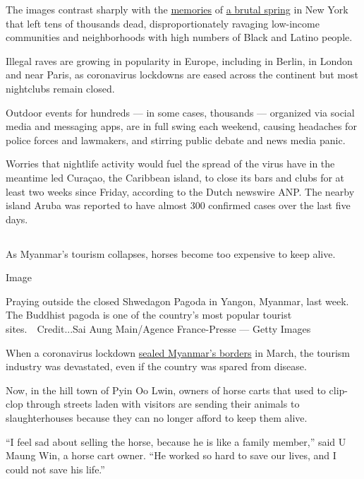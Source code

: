 The images contrast sharply with the
\href{https://www.nytimes.com/2020/08/07/style/coronavirus-nyc-historic-season.html}{memories}
of
\href{https://www.nytimes.com/2020/04/04/nyregion/coronavirus-hospital-brooklyn.html}{a
brutal spring} in New York that left tens of thousands dead,
disproportionately ravaging low-income communities and neighborhoods
with high numbers of Black and Latino people.

Illegal raves are growing in popularity in Europe, including in Berlin,
in London and near Paris, as coronavirus lockdowns are eased across the
continent but most nightclubs remain closed.

Outdoor events for hundreds --- in some cases, thousands --- organized
via social media and messaging apps, are in full swing each weekend,
causing headaches for police forces and lawmakers, and stirring public
debate and news media panic.

Worries that nightlife activity would fuel the spread of the virus have
in the meantime led Curaçao, the Caribbean island, to close its bars and
clubs for at least two weeks since Friday, according to the Dutch
newswire ANP. The nearby island Aruba was reported to have almost 300
confirmed cases over the last five days.

\hypertarget{section-5}{%
\subsection{}\label{section-5}}

As Myanmar's tourism collapses, horses become too expensive to keep
alive.

Image

Praying outside the closed Shwedagon Pagoda in Yangon, Myanmar, last
week. The Buddhist pagoda is one of the country's most popular tourist
sites.~~Credit...Sai Aung Main/Agence France-Presse --- Getty Images

When a coronavirus lockdown
\href{https://www.nytimes.com/2020/03/27/world/asia/coronavirus-myanmar-jobs-china.html?searchResultPosition=7}{sealed
Myanmar's borders} in March, the tourism industry was devastated, even
if the country was spared from disease.

Now, in the hill town of Pyin Oo Lwin, owners of horse carts that used
to clip-clop through streets laden with visitors are sending their
animals to slaughterhouses because they can no longer afford to keep
them alive.

``I feel sad about selling the horse, because he is like a family
member,'' said U Maung Win, a horse cart owner. ``He worked so hard to
save our lives, and I could not save his life.''


